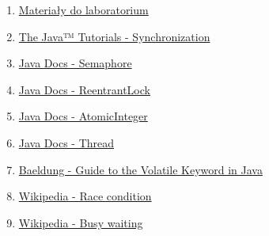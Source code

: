 \documentclass[11pt]{article}
\providecommand{\tightlist}{%
      \setlength{\itemsep}{0pt}\setlength{\parskip}{0pt}}
\begin{document}
\begin{enumerate}
\def\labelenumi{\arabic{enumi}.}
\tightlist
\item
  \href{https://home.agh.edu.pl/~funika/tw/lab1/}{Materiały do
  laboratorium}
\item
  \href{https://docs.oracle.com/javase/tutorial/essential/concurrency/sync.html}{The
  Java™ Tutorials - Synchronization}
\item
  \href{https://docs.oracle.com/javase/8/docs/api/java/util/concurrent/Semaphore.html}{Java
  Docs - Semaphore}
\item
  \href{https://docs.oracle.com/javase/8/docs/api/java/util/concurrent/locks/ReentrantLock.html}{Java
  Docs - ReentrantLock}
\item
  \href{https://docs.oracle.com/javase/8/docs/api/java/util/concurrent/atomic/AtomicInteger.html}{Java
  Docs - AtomicInteger}
\item
  \href{https://docs.oracle.com/javase/8/docs/api/java/lang/Thread.html}{Java
  Docs - Thread}
\item
  \href{https://www.baeldung.com/java-volatile}{Baeldung - Guide to the
  Volatile Keyword in Java}
\item
  \href{https://en.wikipedia.org/wiki/Race_condition}{Wikipedia - Race
  condition}
\item
  \href{https://en.wikipedia.org/wiki/Busy_waiting}{Wikipedia - Busy
  waiting}
\end{enumerate}


    
    
    
\end{document}
